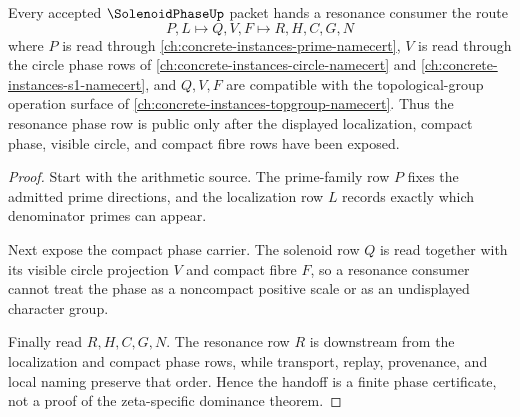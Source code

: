\begin{theorem}
\label{thm:solenoid-phase-resonance-handoff}
Every accepted $\SolenoidPhaseUp$ packet hands a resonance consumer the route
$$
P,L \longmapsto Q,V,F \longmapsto R,H,C,G,N
$$
where $P$ is read through \autoref{ch:concrete-instances-prime-namecert}, $V$ is read through the circle phase rows of \autoref{ch:concrete-instances-circle-namecert} and \autoref{ch:concrete-instances-s1-namecert}, and $Q,V,F$ are compatible with the topological-group operation surface of \autoref{ch:concrete-instances-topgroup-namecert}. Thus the resonance phase row is public only after the displayed localization, compact phase, visible circle, and compact fibre rows have been exposed.
\end{theorem}
\begin{proof}
Start with the arithmetic source. The prime-family row $P$ fixes the admitted prime directions, and the localization row $L$ records exactly which denominator primes can appear.

Next expose the compact phase carrier. The solenoid row $Q$ is read together with its visible circle projection $V$ and compact fibre $F$, so a resonance consumer cannot treat the phase as a noncompact positive scale or as an undisplayed character group.

Finally read $R,H,C,G,N$. The resonance row $R$ is downstream from the localization and compact phase rows, while transport, replay, provenance, and local naming preserve that order. Hence the handoff is a finite phase certificate, not a proof of the zeta-specific dominance theorem.
\end{proof}




